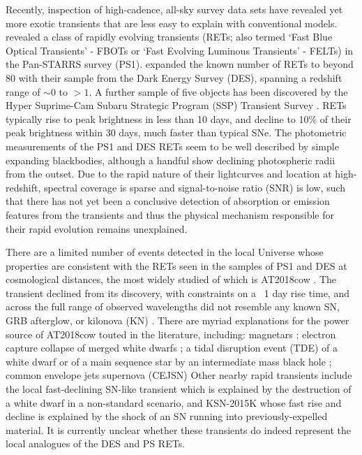 \documentclass[fleqn,usenatbib,]{mnras}
\begin{document}
Recently, inspection of high-cadence, all-sky survey data sets have revealed yet more exotic transients that are less easy to explain with conventional models. \citet{Drout2014} revealed a class of rapidly evolving transients (RETs; also termed `Fast Blue Optical Transients' - FBOTs or `Fast Evolving Luminous Transients' - FELTs) in the Pan-STARRS survey (PS1). \citet{Pursiainen2018} expanded the known number of RETs to beyond 80 with their sample from the Dark Energy Survey (DES), spanning a redshift range of $\sim 0$ to $>1$. A further sample of five objects has been discovered by the Hyper Suprime-Cam Subaru Strategic Program (SSP) Transient Survey \citep{Tampo2020}. RETs typically rise to peak brightness in less than 10 days, and decline to 10\% of their peak brightness within 30 days, much faster than typical SNe. The photometric measurements of the PS1 and DES RETs seem to be well described by simple expanding blackbodies, although a handful show declining photospheric radii from the outset. Due to the rapid nature of their lightcurves and location at high-redshift, spectral coverage is sparse and signal-to-noise ratio (SNR) is low, such that there has not yet been a conclusive detection of absorption or emission features from the transients and thus the physical mechanism responsible for their rapid evolution remains unexplained.

There are a limited number of events detected in the local Universe whose properties are consistent with the RETs seen in the samples of PS1 and DES at cosmological distances, the most widely studied of which is AT2018cow \citep[e.g.][]{Prentice2018,Perley2019}. The transient declined from its discovery, with constraints on a ~1 day rise time, and across the full range of observed wavelengths did not resemble any known SN, GRB afterglow, or kilonova (KN) \citep{Ho2019}. There are myriad explanations for the power source of AT2018cow touted in the literature, including: magnetars \citep{Mohan2020}; electron capture collapse of merged white dwarfs \citep{Lyutikov2019}; a tidal disruption event (TDE) of a white dwarf \citep{Kuin2019} or of a main sequence star by an intermediate mass black hole \citep{Perley2019}; common envelope jets supernova (CEJSN) \citep{Soker2019}
Other nearby rapid transients include the local fast-declining SN-like transient \citep{McBrien2019} which is explained by the destruction of a white dwarf in a non-standard scenario, and KSN-2015K \citep{Rest2018} whose fast rise and decline is explained by the shock of an SN running into previously-expelled material.  It is currently unclear whether these transients do indeed represent the local analogues of the DES and PS RETs.
\end{document}
